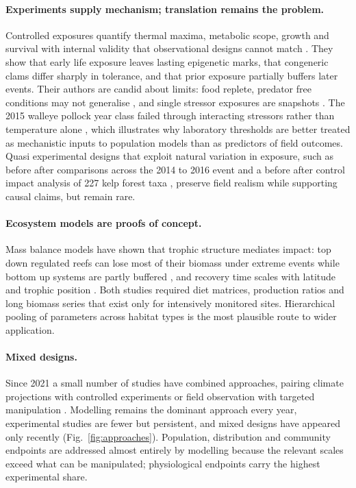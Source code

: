 \paragraph{Experiments supply mechanism; translation remains the problem.}
Controlled exposures quantify thermal maxima, metabolic scope, growth and survival with internal validity that observational designs cannot match \citep{anastasiadi2021,beaudreau2024,horkan2025,spencejones2025}. They show that early life exposure leaves lasting epigenetic marks, that congeneric clams differ sharply in tolerance, and that prior exposure partially buffers later events. Their authors are candid about limits: food replete, predator free conditions may not generalise \citep{spencejones2025}, and single stressor exposures are snapshots \citep{dinh2021}. The 2015 walleye pollock year class failed through interacting stressors rather than temperature alone \citep{rogers2021}, which illustrates why laboratory thresholds are better treated as mechanistic inputs to population models than as predictors of field outcomes. Quasi experimental designs that exploit natural variation in exposure, such as before after comparisons across the 2014 to 2016 event \citep{horkan2025} and a before after control impact analysis of 227 kelp forest taxa \citep{liang2024}, preserve field realism while supporting causal claims, but remain rare.

\paragraph{Ecosystem models are proofs of concept.}
Mass balance models have shown that trophic structure mediates impact: top down regulated reefs can lose most of their biomass under extreme events while bottom up systems are partly buffered \citep{artana2024}, and recovery time scales with latitude and trophic position \citep{guibourd2024}. Both studies required diet matrices, production ratios and long biomass series that exist only for intensively monitored sites. Hierarchical pooling of parameters across habitat types is the most plausible route to wider application.

\paragraph{Mixed designs.}
Since 2021 a small number of studies have combined approaches, pairing climate projections with controlled experiments \citep{moore2023} or field observation with targeted manipulation \citep{spencejones2025}. Modelling remains the dominant approach every year, experimental studies are fewer but persistent, and mixed designs have appeared only recently (Fig.~\ref{fig:approaches}). Population, distribution and community endpoints are addressed almost entirely by modelling because the relevant scales exceed what can be manipulated; physiological endpoints carry the highest experimental share.

